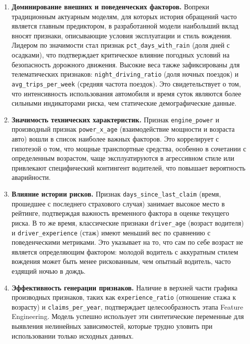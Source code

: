 \begin{enumerate}
    \item \textbf{Доминирование внешних и поведенческих факторов.} Вопреки традиционным актуарным моделям, для которых история обращений часто является главным предиктором, в разработанной модели наибольший вклад вносят признаки, описывающие условия эксплуатации и стиль вождения. Лидером по значимости стал признак \texttt{pct\_days\_with\_rain} (доля дней с осадками), что подтверждает критическое влияние погодных условий на безопасность дорожного движения. Высокие веса также зафиксированы для телематических признаков: \texttt{night\_driving\_ratio} (доля ночных поездок) и \texttt{avg\_trips\_per\_week} (средняя частота поездок). Это свидетельствует о том, что интенсивность использования автомобиля и время суток являются более сильными индикаторами риска, чем статические демографические данные.

    \item \textbf{Значимость технических характеристик.} Признак \texttt{engine\_power} и производный признак \texttt{power\_x\_age} (взаимодействие мощности и возраста авто) вошли в список наиболее важных факторов. Это коррелирует с гипотезой о том, что мощные транспортные средства, особенно в сочетании с определенным возрастом, чаще эксплуатируются в агрессивном стиле или привлекают специфический контингент водителей, что повышает вероятность аварийности.

    \item \textbf{Влияние истории рисков.} Признак \texttt{days\_since\_last\_claim} (время, прошедшее с последнего страхового случая) занимает высокое место в рейтинге, подтверждая важность временного фактора в оценке текущего риска. В то же время, классические признаки \texttt{driver\_age} (возраст водителя) и \texttt{driver\_experience} (стаж) имеют меньший вес по сравнению с поведенческими метриками. Это указывает на то, что сам по себе возраст не является определяющим фактором: молодой водитель с аккуратным стилем вождения может быть менее рискованным, чем опытный водитель, часто ездящий ночью в дождь.

    \item \textbf{Эффективность генерации признаков.} Наличие в верхней части графика производных признаков, таких как \texttt{experience\_ratio} (отношение стажа к возрасту) и \texttt{claims\_per\_year}, подтверждает целесообразность этапа Feature Engineering. Модель успешно использует эти синтетические переменные для выявления нелинейных зависимостей, которые трудно уловить при использовании только исходных данных.
\end{enumerate}

